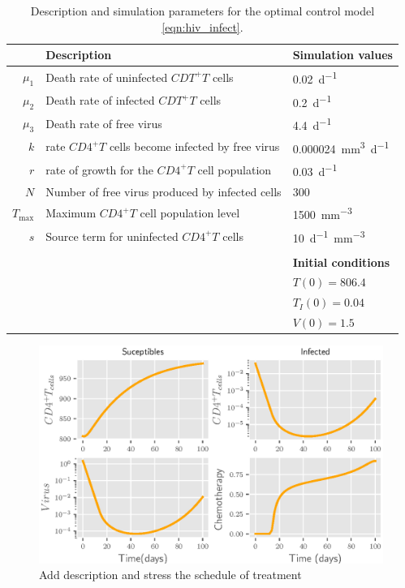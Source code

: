 \begin{table}
	\centering
	\begin{tabular}{rll}
		\toprule
			&\textbf{Description} & \textbf{Simulation values}
            \\
        \midrule
		$\mu_1$ 
        	& Death rate of uninfected $CDT^+T$ cells
        	& \SI{0.02}{d^{-1}} 
            \\
		$\mu_2$ 
       		& Death rate of infected $CDT^+T$ cells
		    & \SI{0.2}{d^{-1}}
			\\
		$\mu_3$ 
      		& Death rate of free virus
		    & \SI{4.4}{d^{-1}}
            \\
        $k$ 
        	& rate $CD4^+T$ cells become infected by free virus
        	& \SI{0.000024}{\milli\meter^3 d^{-1}}
 			\\
		$r$ 
			& rate of growth for the $CD4^+T$ cell population
			& \SI{0.03}{d^{-1}}
     	    \\
     	$N$ 
     		& Number of free virus produced by infected cells
     		& \num{300}
            \\
     	$T_{\max{}}$ 
     		& Maximum $CD4^+T$ cell population level
     		& \SI{1500}{\milli \meter ^ {-3}}
     		\\
     	$s$ 
     		& Source term for uninfected $CD4^{+}T$ cells
     		& \SI{10}{d^{-1}\milli \meter ^{-3}}
		\\
		\\
	    &&
	    \textbf{Initial conditions}
	    \\
	    \cmidrule{3-3}
	    && $T(0) = \num{806.4}$
	    \\
	    && $T_{I}(0)=\num{0.04}$
	    \\
	    && $V(0)= \num{1.5}$
	    \\
		\bottomrule
    \end{tabular}
	\caption{
		Description and simulation parameters for the optimal control model
		\eqref{eqn:hiv_infect}.
	}
	\label{tbl:hiv_infect}
\end{table}
\begin{figure}[tbh]
\centering
	\includegraphics{Figures/hiv_chemotherapy_fig_01}
	\caption{Add description and stress the schedule of treatment}
	\label{fig:hivchemotherapyfig01}
\end{figure}
